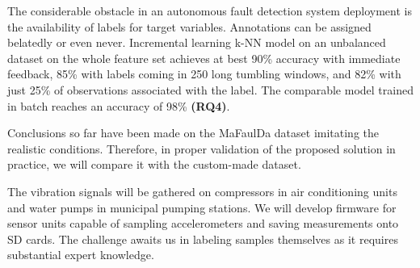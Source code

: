 The considerable obstacle in an autonomous fault detection system deployment is the availability of labels for target variables. Annotations can be assigned belatedly or even never. Incremental learning k-NN model on an unbalanced dataset on the whole feature set achieves at best 90\% accuracy with immediate feedback, 85\% with labels coming in 250 long tumbling windows, and 82\% with just 25\% of observations associated with the label. The comparable model trained in batch reaches an accuracy of 98\% \textbf{(RQ4)}.

Conclusions so far have been made on the MaFaulDa dataset imitating the realistic conditions. Therefore, in proper validation of the proposed solution in practice, we will compare it with the custom-made dataset. 

The vibration signals will be gathered on compressors in air conditioning units and water pumps in municipal pumping stations. We will develop firmware for sensor units capable of sampling accelerometers and saving measurements onto SD cards. The challenge awaits us in labeling samples themselves as it requires substantial expert knowledge. 
